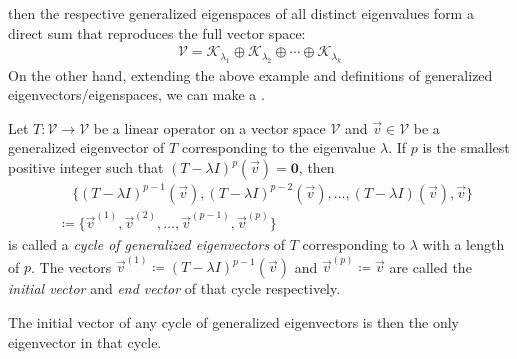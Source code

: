 then the respective generalized eigenspaces of all distinct eigenvalues form a direct sum that reproduces the full vector space:
\begin{align}
\mathcal{V} = \mathcal{K}_{\lambda_1} \oplus \mathcal{K}_{\lambda_2} \oplus \cdots \oplus \mathcal{K}_{\lambda_k} \label{eqn:VKKK}
\end{align} 
On the other hand, extending the above example and definitions of generalized eigenvectors/eigenspaces, we can make a .
\begin{defn}
Let $T: \mathcal{V} \to \mathcal{V}$ be a linear operator on a vector space $\mathcal{V}$ and $\vec{v} \in \mathcal{V}$ be a generalized eigenvector of $T$ corresponding to the eigenvalue $\lambda$. If $p$ is the smallest positive integer such that $(T-\lambda I)^p (\vec{v}) = \textbf{0}$, then
\begin{align}
&\quad \{(T-\lambda I)^{p-1}(\vec{v}), (T-\lambda I)^{p-2}(\vec{v}), \ldots, (T-\lambda I)(\vec{v}),\vec{v}\} \label{eqn:B6}\\
&\coloneqq \{\vec{v}^{(1)}, \vec{v}^{(2)}, \ldots, \vec{v}^{(p-1)}, \vec{v}^{(p)}\} \nonumber
\end{align}
is called a \textit{cycle of generalized eigenvectors} of $T$ corresponding to $\lambda$ with a length of $p$. The vectors $\vec{v}^{(1)} \coloneqq (T-\lambda I)^{p-1}(\vec{v})$ and $\vec{v}^{(p)} \coloneqq \vec{v}$ are called the \textit{initial vector} and \textit{end vector} of that cycle respectively.
\end{defn}
The initial vector of any cycle of generalized eigenvectors is then the only eigenvector in that cycle.\par

